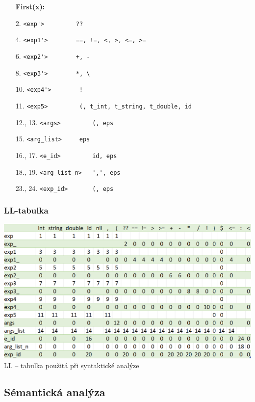 \documentclass[12pt]{article}
\begin{document}
\begin{enumerate}[noitemsep]
    \textbf{First(x):}
            \item[2.] \verb|<exp'>         ??|
            \item[4.] \verb|<exp1'>        ==, !=, <, >, <=, >=|
            \item[6.] \verb|<exp2'>        +, -|
            \item[8.] \verb|<exp3'>        *, \|
            \item[10.] \verb|<exp4'>        !|
            \item[11.] \verb|<exp5>         (, t_int, t_string, t_double, id|
            \item[12., 13.] \verb|<args>         (, eps|
            \item[15.] \verb|<arg_list>     eps|
            \item[16., 17.] \verb|<e_id>         id, eps|
            \item[18., 19.] \verb|<arg_list_n>   ',', eps|
            \item[23., 24.] \verb|<exp_id>       (, eps|
            
        \end{enumerate}

\subsubsection{LL-tabulka}
\begin{table}[!ht]
		\centering
		\includegraphics[width=0.9\linewidth]{img/LL-table.png} \\
		\caption{LL -- tabulka použitá při syntaktické analýze}
		\label{table:ll_table}
	\end{table}

\subsection{Sémantická analýza}

\end{document}
